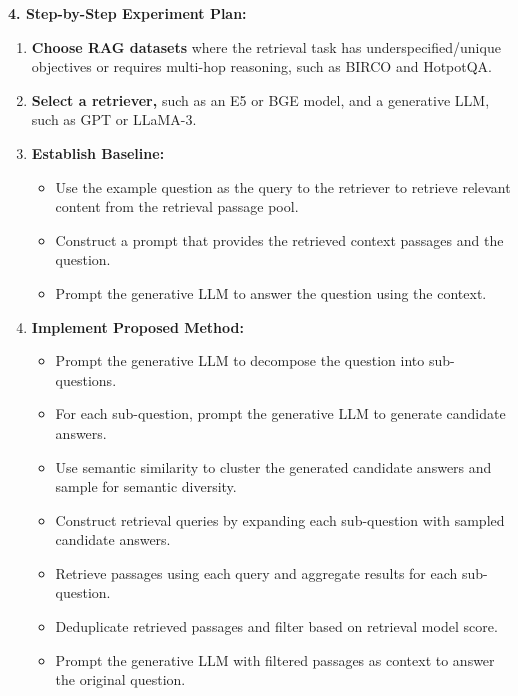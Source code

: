 \begin{tcolorbox}[colback=blue!5!white,colframe=blue!75!black,title=\textbf{LLM Directed Retrieval Querying for Improving Factuality (Part 1)}]
\textbf{4. Step-by-Step Experiment Plan:}
    \begin{enumerate}
        \item \textbf{Choose RAG datasets} where the retrieval task has underspecified/unique objectives or requires multi-hop reasoning, such as BIRCO and HotpotQA.
        \item \textbf{Select a retriever,} such as an E5 or BGE model, and a generative LLM, such as GPT or LLaMA-3.
        \item \textbf{Establish Baseline:}
        \begin{itemize}
            \item[(a)] Use the example question as the query to the retriever to retrieve relevant content from the retrieval passage pool.
            \item[(b)] Construct a prompt that provides the retrieved context passages and the question.
            \item[(c)] Prompt the generative LLM to answer the question using the context.
        \end{itemize}
        \item \textbf{Implement Proposed Method:}
        \begin{itemize}
            \item[(a)] Prompt the generative LLM to decompose the question into sub-questions.
            \item[(b)] For each sub-question, prompt the generative LLM to generate candidate answers.
            \item[(c)] Use semantic similarity to cluster the generated candidate answers and sample for semantic diversity.
            \item[(d)] Construct retrieval queries by expanding each sub-question with sampled candidate answers.
            \item[(e)] Retrieve passages using each query and aggregate results for each sub-question.
            \item[(f)] Deduplicate retrieved passages and filter based on retrieval model score.
            \item[(g)] Prompt the generative LLM with filtered passages as context to answer the original question.
        \end{itemize}
    \end{enumerate}
\end{tcolorbox}

\newpage 


